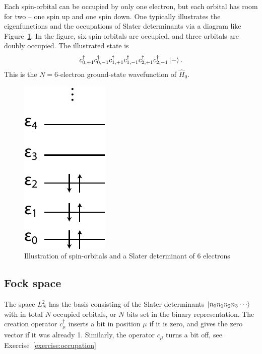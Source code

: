 \documentclass{report}
\theoremstyle{plain}
\theoremstyle{definition}
\begin{document}
Each spin-orbital can be occupied by only one electron, but each
orbital has room for two -- one spin up and one spin down. One
typically illustrates the eigenfunctions and the occupations of Slater
determinants via a
diagram like Figure~\ref{fig:orbitals}. In the figure, six
spin-orbitals are occupied, and three orbitals are doubly
occupied. The illustrated state is
\begin{equation}
   c^\dag_{0,+1}
  c^\dag_{0,-1}
  c^\dag_{1,+1}
  c^\dag_{1,-1}
  c^\dag_{2,+1}
  c^\dag_{2,-1} \ket{-}.
\end{equation}
This is the $N=6$-electron ground-state wavefunction of $\hat{H}_0$.

\begin{figure}
  \begin{center}
    \includegraphics{orbitals.pdf}
  \end{center}
  \caption{\label{fig:orbitals} Illustration of spin-orbitals and a
    Slater determinant of 6 electrons}
\end{figure}




\subsection{Fock space}

The space $L^2_N$ has the
basis consisting of the Slater determinants $\ket{n_0n_1n_2n_3\cdots}$
with in total $N$ occupied orbitals, or $N$ bits set in the binary
representation. The creation operator $c^\dag_\mu$ inserts
a bit in position $\mu$ if it is zero, and gives the zero vector if it
was already 1. Similarly, the operator $c_\mu$ turns a bit off, see
Exercise~\ref{exercise:occupation} 
\end{document}
